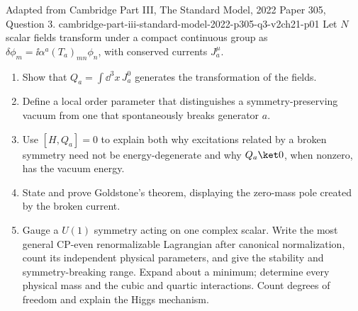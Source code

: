 
\begin{enumerate}
  {Adapted from Cambridge Part III, The Standard Model, 2022 Paper 305, Question 3.}
  {cambridge-part-iii-standard-model-2022-p305-q3-v2ch21-p01}
  Let \(N\) scalar fields transform under a compact continuous group as
  \(\delta\phi_m=\ii\alpha^a(T_a)_{mn}\phi_n\), with conserved currents
  \(J^\mu_a\).
  \begin{enumerate}
    \item[(a)] Show that
      \(Q_a=\int \dd^3x\,J^0_a\) generates the transformation of the fields.
    \item[(b)] Define a local order parameter that distinguishes a
      symmetry-preserving vacuum from one that spontaneously breaks
      generator \(a\).
    \item[(c)] Use \([H,Q_a]=0\) to explain both why excitations related by
      a broken symmetry need not be energy-degenerate and why
      \(Q_a\ket0\), when nonzero, has the vacuum energy.
    \item[(d)] State and prove Goldstone's theorem, displaying the
      zero-mass pole created by the broken current.
    \item[(e)] Gauge a \(U(1)\) symmetry acting on one complex scalar.
      Write the most general CP-even renormalizable Lagrangian after
      canonical normalization, count its independent physical parameters,
      and give the stability and symmetry-breaking range.  Expand about a
      minimum; determine every physical mass and the cubic and quartic
      interactions.  Count degrees of freedom and explain the Higgs
      mechanism.
  \end{enumerate}


\end{enumerate}
